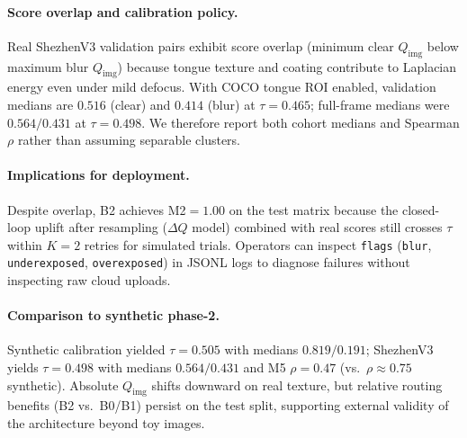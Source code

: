 \paragraph{Score overlap and calibration policy.}
Real ShezhenV3 validation pairs exhibit score overlap (minimum clear $Q_{\mathrm{img}}$ below maximum blur $Q_{\mathrm{img}}$) because tongue texture and coating contribute to Laplacian energy even under mild defocus.
With COCO tongue ROI enabled, validation medians are $0.516$ (clear) and $0.414$ (blur) at $\tau{=}0.465$; full-frame medians were $0.564/0.431$ at $\tau{=}0.498$.
We therefore report both cohort medians and Spearman $\rho$ rather than assuming separable clusters.

\paragraph{Implications for deployment.}
Despite overlap, B2 achieves M2$=1.00$ on the test matrix because the closed-loop uplift after resampling ($\Delta Q$ model) combined with real scores still crosses $\tau$ within $K{=}2$ retries for simulated trials.
Operators can inspect \texttt{flags} (\texttt{blur}, \texttt{underexposed}, \texttt{overexposed}) in JSONL logs to diagnose failures without inspecting raw cloud uploads.

\paragraph{Comparison to synthetic phase-2.}
Synthetic calibration yielded $\tau{=}0.505$ with medians $0.819/0.191$; ShezhenV3 yields $\tau{=}0.498$ with medians $0.564/0.431$ and M5 $\rho{=}0.47$ (vs.\ $\rho{\approx}0.75$ synthetic).
Absolute $Q_{\mathrm{img}}$ shifts downward on real texture, but relative routing benefits (B2 vs.\ B0/B1) persist on the test split, supporting external validity of the architecture beyond toy images.
